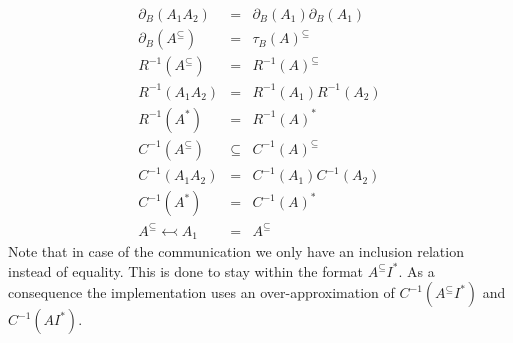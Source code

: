 \documentclass{article}
\begin{document}
\[
\begin{array}{lll}
\partial _{B}\left( A_{1}A_{2}\right)  & = & \partial _{B}\left(
A_{1}\right) \partial _{B}\left( A_{1}\right)  \\ 
\partial _{B}\left( A^{\subseteq }\right)  & = & \tau _{B}(A)^{\subseteq }
\\ 
R^{-1}\left( A^{\subseteq }\right)  & = & R^{-1}\left( A\right) ^{\subseteq }
\\ 
R^{-1}\left( A_{1}A_{2}\right)  & = & R^{-1}\left( A_{1}\right) R^{-1}\left(
A_{2}\right)  \\ 
R^{-1}\left( A^{\ast }\right)  & = & R^{-1}\left( A\right) ^{\ast } \\ 
C^{-1}\left( A^{\subseteq }\right)  & \subseteq  & C^{-1}\left( A\right)
^{\subseteq } \\ 
C^{-1}\left( A_{1}A_{2}\right)  & = & C^{-1}\left( A_{1}\right) C^{-1}\left(
A_{2}\right)  \\ 
C^{-1}\left( A^{\ast }\right)  & = & C^{-1}\left( A\right) ^{\ast } \\ 
A^{\subseteq }\leftarrowtail A_{1} & = & A^{\subseteq }%
\end{array}%
\]%
Note that in case of the communication we only have an inclusion relation
instead of equality. This is done to stay within the format $A^{\subseteq
}I^{\ast }$. As a consequence the implementation uses an over-approximation
of $C^{-1}\left( A^{\subseteq }I^{\ast }\right) $ and $C^{-1}\left( AI^{\ast
}\right) $.
\end{document}
